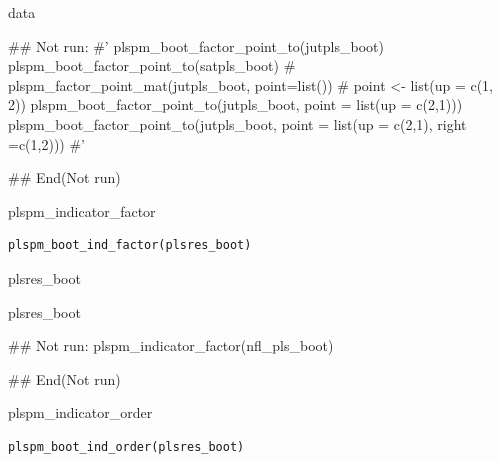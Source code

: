 \documentclass[a4paper]{book}
\begin{document}
%
\begin{Value}
data
\end{Value}
%
\begin{Examples}
\begin{ExampleCode}

\#\# Not run: 
#'
plspm_boot_factor_point_to(jutpls_boot)
plspm_boot_factor_point_to(satpls_boot)
# plspm_factor_point_mat(jutpls_boot, point=list())
# point <- list(up = c(1, 2))
plspm_boot_factor_point_to(jutpls_boot, point = list(up = c(2,1)))
plspm_boot_factor_point_to(jutpls_boot, point = list(up = c(2,1), right =c(1,2)))
#'

## End(Not run)



\end{ExampleCode}
\end{Examples}
%
\begin{Description}
plspm\_indicator\_factor
\end{Description}
%
\begin{Usage}
\begin{verbatim}
plspm_boot_ind_factor(plsres_boot)
\end{verbatim}
\end{Usage}
%
\begin{Arguments}
\begin{ldescription}
\item[\code{plsres\_boot}] plsres\_boot
\end{ldescription}
\end{Arguments}
%
\begin{Value}
plsres\_boot
\end{Value}
%
\begin{Examples}
\begin{ExampleCode}
\#\# Not run: 
plspm_indicator_factor(nfl_pls_boot)

## End(Not run)
\end{ExampleCode}
\end{Examples}
%
\begin{Description}
plspm\_indicator\_order
\end{Description}
%
\begin{Usage}
\begin{verbatim}
plspm_boot_ind_order(plsres_boot)
\end{verbatim}
\end{Usage}
\end{document}
